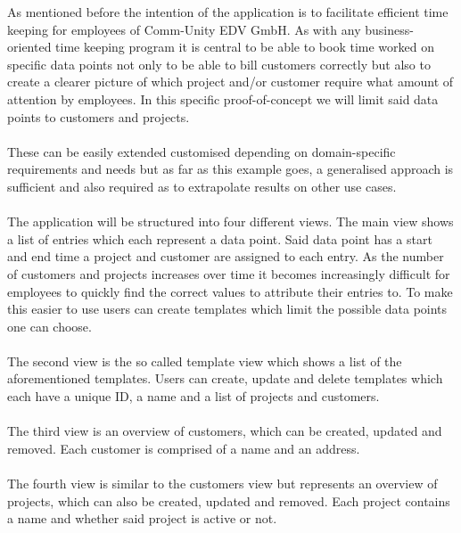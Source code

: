 
As mentioned before the intention of the application is to facilitate efficient time keeping 
for employees of Comm-Unity EDV GmbH. 
As with any business-oriented time keeping program it is central to be able to book 
time worked on specific data points not only to be able to bill customers correctly but also to 
create a clearer picture of which project and/or customer require what amount of attention by 
employees.
In this specific proof-of-concept we will limit said data points to customers and projects.\paragraph{}
These can be easily extended customised depending on domain-specific requirements and needs but as far 
as this example goes, a generalised approach is sufficient and also required as to extrapolate results 
on other use cases.\paragraph{}
The application will be structured into four different views. 
The main view shows a list of entries which each represent a data point.
Said data point has a start and end time a project and customer are assigned to each entry. 
As the number of customers and projects increases over time it becomes increasingly difficult for 
employees to quickly find the correct values to attribute their entries to.
To make this easier to use users can create templates which limit the possible data points one can
choose.\paragraph{}
The second view is the so called template view which shows a list of the aforementioned templates.
Users can create, update and delete templates which each have a unique ID, a name and a list of projects 
and customers.\paragraph{}
The third view is an overview of customers, which can be created, updated and removed. 
Each customer is comprised of a name and an address.\paragraph{}
The fourth view is similar to the customers view but represents an overview of projects, which 
can also be created, updated and removed.
Each project contains a name and whether said project is active or not.\paragraph{}

